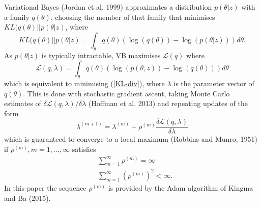 \documentclass[12pt,a4paper]{article}\usepackage[]{graphicx}\usepackage[]{color}
\begin{document}
Variational Bayes (Jordan et al. 1999) approximates a distribution $p(\theta | z)$ with a family $q(\theta)$, choosing the member of that family that minimises $KL(q(\theta) || p(\theta | z)$, where
\begin{equation}
\label{KL-div}
KL(q(\theta) || p(\theta | z) = \int_{\theta} q(\theta) \left(\log(q(\theta)) - \log(p(\theta | z))\right) d\theta.
\end{equation}
As $p(\theta | z)$ is typically intractable, VB maximises $\mathcal{L}(q)$ where
\begin{equation}
\label{ELBO}
\mathcal{L}(q, \lambda) = \int_{\theta} q(\theta) \left(\log(p(\theta, z)) - \log(q(\theta))\right) d\theta
\end{equation}
which is equivalent to minimising (\ref{KL-div}), where $\lambda$ is the parameter vector of $q(\theta)$.
This is done with stochastic gradient ascent, taking Monte Carlo estimates of $\delta\mathcal{L}(q, \lambda) / \delta \lambda$ (Hoffman et al. 2013)
and repeating updates of the form
\begin{equation}
\label{gradientAscent}
\lambda^{(m+1)} = \lambda^{(m)} + \rho^{(m)} \frac{\delta\mathcal{L}(q, \lambda)}{\delta \lambda} 
\end{equation}
which is guaranteed to converge to a local maximum (Robbins and Munro, 1951) if $\rho^{(m)}, m = 1, \dots, \infty$ satisfies
\begin{align}
&\sum_{m=1}^{\infty} \rho^{(m)} =  \infty \\
&\sum_{m=1}^{\infty} (\rho^{(m)})^2 <  \infty.
\end{align}
In this paper the sequence $\rho^{(m)}$ is provided by the Adam algorithm of Kingma and Ba (2015).
\end{document}

